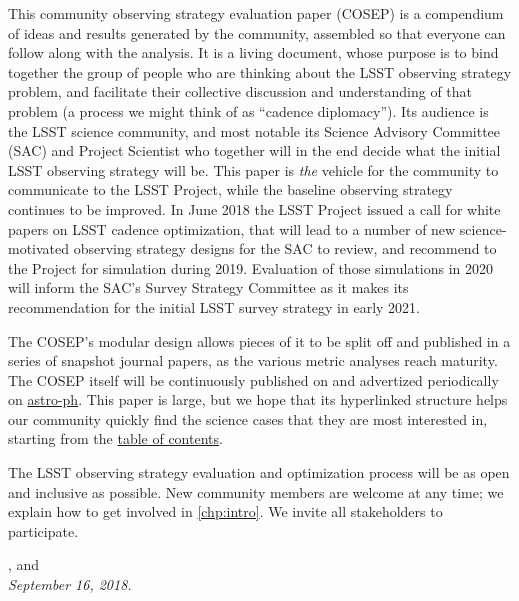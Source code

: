 \noindent This community observing strategy evaluation paper (COSEP) is a compendium of ideas and results
generated by the community, assembled so that everyone can follow along
with the analysis. It is a living document, whose purpose is to bind
together the group of people who are thinking about the LSST observing
strategy problem, and facilitate their collective discussion and
understanding of that problem (a process we might think of as  ``cadence
diplomacy''). Its audience is the LSST science community, and most notable its Science
Advisory Committee (SAC) and Project Scientist who together will in the end decide what the initial LSST observing strategy will be. This paper is {\it
the} vehicle for the community to communicate to the LSST Project, while
the baseline observing strategy continues to be improved. In June 2018 the LSST Project issued a call for white papers on LSST cadence optimization, that will lead to a number of new science-motivated observing strategy designs for the SAC to review, and recommend to the Project for simulation during 2019. Evaluation of those simulations in 2020 will inform the SAC's Survey Strategy Committee as it makes its recommendation for the initial LSST survey strategy in early 2021.

\noindent The COSEP's modular design allows pieces of it to be
split off and published in a series of snapshot journal papers, as the
various metric analyses reach maturity. The COSEP itself will be
continuously published on
\href{https://github.com/LSSTScienceCollaborations/ObservingStrategy}{\GitHub}
and advertized periodically on \href{http://arxiv.org}{astro-ph}. This
paper is large, but we hope that its hyperlinked structure helps
our community quickly find the science cases that they are most interested in,
starting from the \hyperref[toc]{table of contents}.

\noindent The LSST observing strategy evaluation and optimization
process will be as open and inclusive as possible. New community members
are welcome at any time; we explain how to get involved in \autoref{chp:intro}.  We invite all stakeholders to participate.

\vspace{2\baselineskip}

{\raggedleft {},  and  \\
 \medskip \hspace{0.8\linewidth} \it September 16, 2018.}

\clearpage
